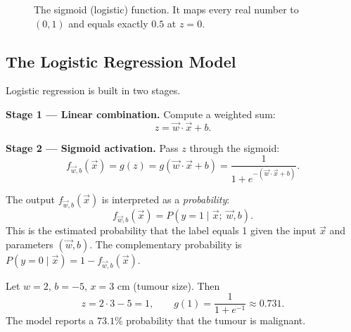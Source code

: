 \begin{figure}[h]
\centering
{}
\caption{The sigmoid (logistic) function. It maps every real number to $(0,1)$
and equals exactly $0.5$ at $z=0$.}
\label{fig:sigmoid}
\end{figure}

\subsection{The Logistic Regression Model}

Logistic regression is built in two stages.

\textbf{Stage 1 --- Linear combination.} Compute a weighted sum:
\[z=\vec{w}\cdot\vec{x}+b.\]

\textbf{Stage 2 --- Sigmoid activation.} Pass $z$ through the sigmoid:
\[
f_{\vec{w},b}(\vec{x})=g(z)=g(\vec{w}\cdot\vec{x}+b)
=\frac{1}{1+e^{-(\vec{w}\cdot\vec{x}+b)}}.
\]

The output $f_{\vec{w},b}(\vec{x})$ is interpreted as a \emph{probability}:
\[
f_{\vec{w},b}(\vec{x})=P(y=1\mid\vec{x};\;\vec{w},b).
\]
This is the estimated probability that the label equals 1 given the input
$\vec{x}$ and parameters $(\vec{w},b)$. The complementary probability is
$P(y=0\mid\vec{x})=1-f_{\vec{w},b}(\vec{x})$.

\begin{example}
Let $w=2$, $b=-5$, $x=3$ cm (tumour size). Then
\[z=2\cdot 3-5=1,\qquad g(1)=\frac{1}{1+e^{-1}}\approx 0.731.\]
The model reports a $73.1\%$ probability that the tumour is malignant.
\end{example}

